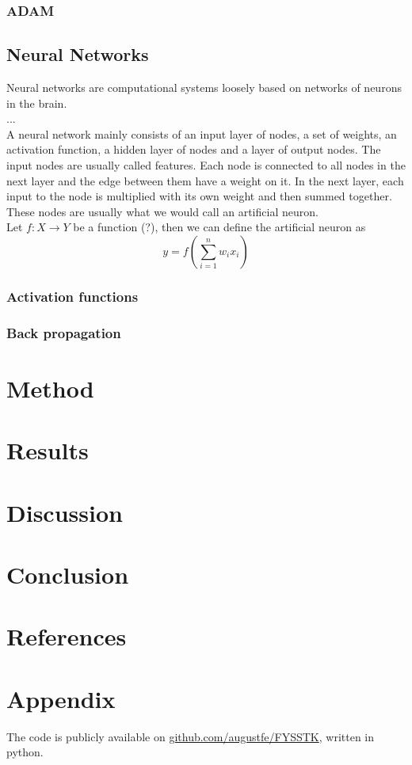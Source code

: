 \documentclass{article}
\begin{document}
\subsubsection{ADAM}


\subsection{Neural Networks}
Neural networks are computational systems loosely based on networks of neurons in the brain. \\
... \\
A neural network mainly consists of an input layer of nodes, a set of weights, an activation function, a hidden layer of nodes and a layer of output nodes. The input nodes are usually called features. Each node is connected to all nodes in the next layer and the edge between them have a weight on it. In the next layer, each input to the node is multiplied with its own weight and then summed together. These nodes are usually what we would call an artificial neuron.\\
Let $f: X \rightarrow Y$ be a function (?), then we can define the artificial neuron as
\begin{equation*}
    y = f(\sum_{i=1}^{n}w_ix_i)
\end{equation*}


\subsubsection{Activation functions}

\subsubsection{Back propagation}

\section{Method}

\section{Results}

\section{Discussion}

\section{Conclusion}

\section{References}


\section{Appendix}
The code is publicly available on \href{https://github.com/augustfe/FYSSTK}{github.com/augustfe/FYSSTK}, written in python.
\end{document}
